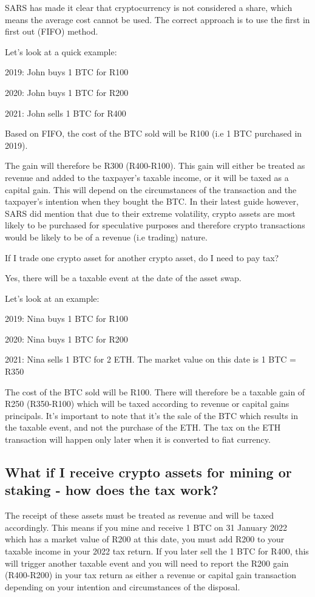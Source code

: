 SARS has made it clear that cryptocurrency is not considered a share, which means the average cost cannot be used. The correct approach is to use the first in first out (FIFO) method. 

Let's look at a quick example: 

2019: John buys 1 BTC for R100 

2020: John buys 1 BTC for R200

2021: John sells 1 BTC for R400

Based on FIFO, the cost of the BTC sold will be R100 (i.e  1 BTC purchased in 2019).

The gain will therefore be R300 (R400-R100). This gain will either be treated as revenue and added to the taxpayer's taxable income, or it will be taxed as a capital gain. This will depend on the circumstances of the transaction and the taxpayer's intention when they bought the BTC. In their latest guide however,  SARS did mention that due to their extreme volatility, crypto assets are most likely to be purchased for speculative purposes and therefore crypto transactions would be likely to be of a revenue (i.e trading) nature.

If I trade one crypto asset for another crypto asset, do I need to pay tax?

Yes, there will be a taxable event at the date of the asset swap.

Let's look at an example:

2019: Nina buys 1 BTC for R100 

2020: Nina buys 1 BTC for R200

2021: Nina sells 1 BTC for 2 ETH. The market value on this date is 1 BTC = R350

The cost of the BTC sold will be R100. There will therefore be a taxable gain of R250 (R350-R100) which will be taxed according to revenue or capital gains principals. It's important to note that it's the sale of the BTC which results in the taxable event, and not the purchase of the ETH. The tax on the ETH transaction will happen only later when it is converted to fiat currency.

\subsection{What if I receive crypto assets for mining or staking - how does the tax work?}

The receipt of these assets must be treated as revenue and will be taxed accordingly. This means if you mine and receive 1 BTC on 31 January 2022 which has a market value of R200 at this date, you must add R200 to your taxable income in your 2022 tax return.  If you later sell the 1 BTC for R400, this will trigger another taxable event and you will need to report the R200 gain (R400-R200) in your tax return as either a revenue or capital gain transaction depending on your intention and circumstances of the disposal.

